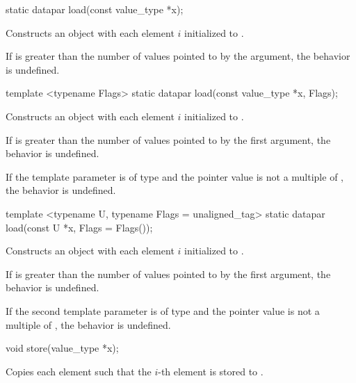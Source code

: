 \begin{wgText}
  \begin{itemdecl}
static datapar load(const value_type *x);
  \end{itemdecl}
  \begin{itemdescr}
    \pnum
    \effects
    Constructs an object with each element $i$ initialized to .

    \pnum
    If \datapar{} is greater than the number of values pointed to by the argument, the behavior is undefined.
  \end{itemdescr}

  \begin{itemdecl}
template <typename Flags> static datapar load(const value_type *x, Flags);
  \end{itemdecl}
  \begin{itemdescr}
    \pnum
    \effects
    Constructs an object with each element $i$ initialized to .

    \pnum
    If \datapar{} is greater than the number of values pointed to by the first argument, the behavior is undefined.

    \pnum
    If the template parameter is of type  and the pointer value is not a multiple of , the behavior is undefined.
  \end{itemdescr}

  \begin{itemdecl}
template <typename U, typename Flags = unaligned_tag> static datapar load(const U *x, Flags = Flags());
  \end{itemdecl}
  \begin{itemdescr}
    \pnum
    \effects
    Constructs an object with each element $i$ initialized to .

    \pnum
    If \datapar{} is greater than the number of values pointed to by the first argument, the behavior is undefined.

    \pnum
    If the second template parameter is of type  and the pointer value is not a multiple of , the behavior is undefined.
  \end{itemdescr}

  \begin{itemdecl}
void store(value_type *x);
  \end{itemdecl}
  \begin{itemdescr}
    \pnum \effects Copies each element such that the $i$-th element is stored to .


\end{itemdescr}
\end{wgText}
